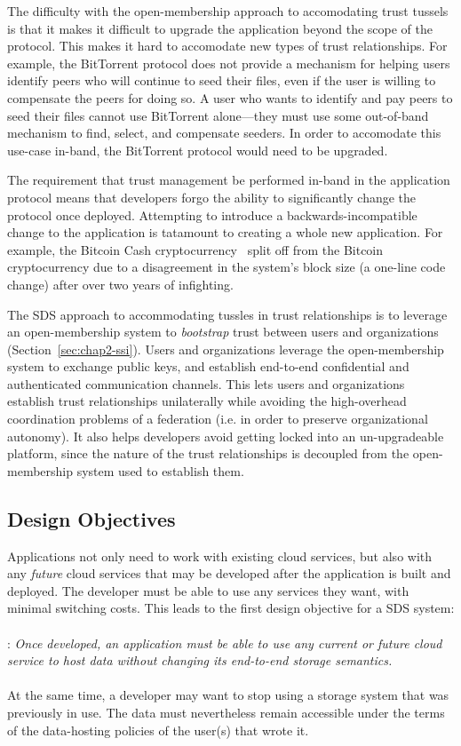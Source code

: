 The difficulty with the open-membership approach to accomodating trust tussels is that
it makes it difficult to upgrade the application beyond the scope of the
protocol.  This makes it hard to accomodate new types of trust relationships.
For example, the BitTorrent protocol does not provide a mechanism for helping
users identify peers who will continue to seed their files, even if the user is
willing to compensate the peers for doing so.  A user who wants to identify
and pay peers to seed their files cannot use BitTorrent alone---they must use
some out-of-band mechanism to find, select, and compensate seeders.  In order to
accomodate this use-case in-band, the BitTorrent protocol would need to be
upgraded.

The requirement that trust management be performed in-band in the application
protocol means that developers forgo the ability to significantly change the
protocol once deployed.  Attempting to introduce a backwards-incompatible change to the
application is tatamount to creating a whole new application.  For example,
the Bitcoin Cash cryptocurrency~\cite{bcash} split off from the Bitcoin
cryptocurrency due to a disagreement in the system's block size (a one-line code
change) after over two years of infighting.

The SDS approach to accommodating tussles in trust relationships is to leverage
an open-membership system to \emph{bootstrap} trust between
users and organizations (Section~\ref{sec:chap2-ssi}).  Users and
organizations leverage the open-membership system to exchange public keys, and
establish end-to-end confidential and authenticated communication channels.
This lets users and organizations establish trust relationships unilaterally while
avoiding the high-overhead coordination problems of a
federation (i.e. in order to preserve organizational autonomy).
It also helps developers avoid getting locked into an un-upgradeable platform,
since the nature of the trust relationships is decoupled from the
open-membership system used to establish them.

\subsection{Design Objectives}

Applications not only need to work with existing cloud services, but also with
any \emph{future} cloud services that may be developed after the application is
built and deployed.  The developer must be able to use any services they want,
with minimal switching costs.  This leads to the first design objective for a SDS
system:
\\
\\
: \emph{Once developed, an application must be
able to use any current or future 
cloud service to host data without changing its end-to-end storage semantics.}
\\
\\
At the same time, a developer may want to stop using a storage system that was
previously in use.  The data must nevertheless remain accessible under the
terms of the data-hosting policies of the user(s) that wrote it.

